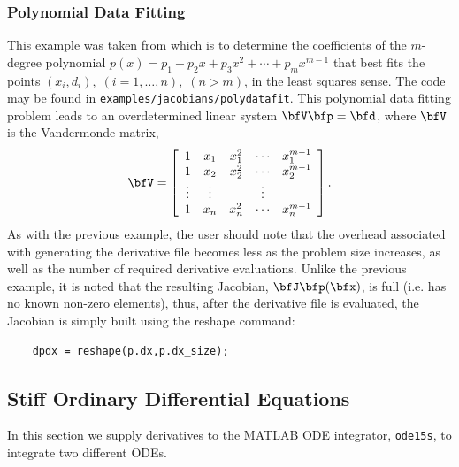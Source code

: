 \documentclass[10pt,pdftex]{article}
\begin{document}
\subsubsection{Polynomial Data Fitting}
This example was taken from \cite{Bischof2002CST} which  is to determine the coefficients of the $m$-degree
polynomial $p(x) = p_1 + p_2 x + p_3 x^2 + \cdots + p_m x^{m-1}$ that
best fits the points $(x_i,d_i),\;(i = 1,\dots,n),\; (n > m)$, in the least
squares sense. The code may be found in \texttt{examples/jacobians/polydatafit}. This polynomial data fitting problem leads to an 
overdetermined linear system $\bfV \bfp = \bfd$, where $\bfV$ is the
Vandermonde matrix,  
\begin{equation}
\bfV = \left[ \begin{array}{c c c c c}
1 & x_1 & x_1^2 & \cdots & x_1^{m-1} \\
1 & x_2 & x_2^2 & \cdots & x_2^{m-1} \\
\vdots & \vdots &  & \vdots \\
1 & x_n & x_n^2 & \cdots & x_n^{m-1}\\
\end{array}\right].
\end{equation}
As with the previous example, the user should note that the overhead associated with generating the derivative file becomes less as the problem size increases, as well as the number of required derivative evaluations. Unlike the previous example, it is noted that the resulting Jacobian, $\bfJ\bfp(\bfx)$, is full (i.e. has no known non-zero elements), thus, after the derivative file is evaluated, the Jacobian is simply built using the reshape command:
\begin{verbatim}
    dpdx = reshape(p.dx,p.dx_size);
\end{verbatim}

\subsection{Stiff Ordinary Differential Equations}
In this section we supply derivatives to the MATLAB ODE integrator, \texttt{ode15s}, to integrate two different ODEs.
\end{document}
